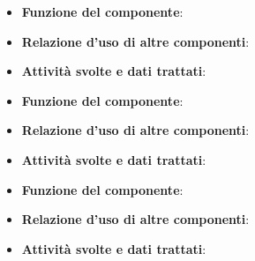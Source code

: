 
\begin{itemize}
	\item\textbf{Funzione del componente}: 
	\item\textbf{Relazione d'uso di altre componenti}: 
	\item\textbf{Attività svolte e dati trattati}:
\end{itemize}


\begin{itemize}
	\item\textbf{Funzione del componente}: 
	\item\textbf{Relazione d'uso di altre componenti}: 
	\item\textbf{Attività svolte e dati trattati}:
\end{itemize}


\begin{itemize}
	\item\textbf{Funzione del componente}: 
	\item\textbf{Relazione d'uso di altre componenti}: 
	\item\textbf{Attività svolte e dati trattati}:
\end{itemize}


